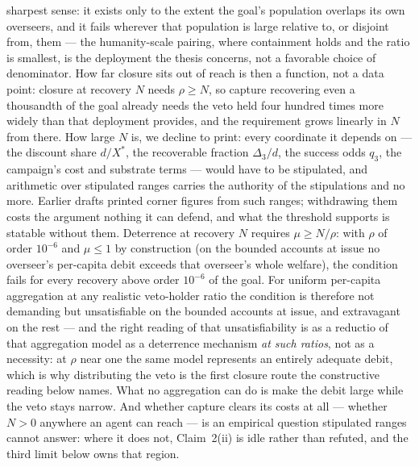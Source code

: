 \documentclass[11pt]{article}
\theoremstyle{definition}
\begin{document}
sharpest sense: it exists only to the extent the goal's population overlaps its own
overseers, and it fails wherever that population is large relative to, or disjoint
from, them --- the
humanity-scale pairing, where containment holds and the ratio is smallest, is the
deployment the thesis concerns, not a favorable choice of denominator. How far closure sits out of reach
is then a function, not a data point: closure at recovery $N$ needs $\rho \geq N$, so
capture recovering even a thousandth of the goal already needs the veto held four
hundred times more widely than that deployment provides, and the requirement grows
linearly in $N$ from there. How large $N$ is, we decline to print: every coordinate it depends on --- the discount share $d/X^{*}$, the recoverable fraction $\Delta_3/d$, the success odds $q_3$, the campaign's cost and substrate terms --- would have to be stipulated, and arithmetic over stipulated ranges carries the authority of the stipulations and no more. Earlier drafts printed corner figures from such ranges; withdrawing them costs the argument nothing it can defend, and what the threshold supports is statable without them. Deterrence at recovery $N$ requires $\mu \geq N/\rho$: with $\rho$ of order $10^{-6}$ and $\mu \leq 1$ by construction (on the bounded accounts at issue no overseer's per-capita debit exceeds that overseer's whole welfare), the condition fails for every recovery above order $10^{-6}$ of the goal. For uniform per-capita aggregation at any realistic veto-holder ratio the condition is therefore not demanding but unsatisfiable on the bounded accounts at issue, and extravagant on the rest --- and the right reading of that unsatisfiability is as a reductio of that aggregation model as a deterrence mechanism \emph{at such ratios}, not as a necessity: at $\rho$ near one the same model represents an entirely adequate debit, which is why distributing the veto is the first closure route the constructive reading below names. What no aggregation can do is make the debit large while the veto stays narrow. And whether capture clears its costs at all --- whether $N > 0$ anywhere an agent can reach --- is an empirical question stipulated ranges cannot answer: where it does not, Claim~2(ii) is idle rather than refuted, and the third limit below owns that region.
\end{document}
